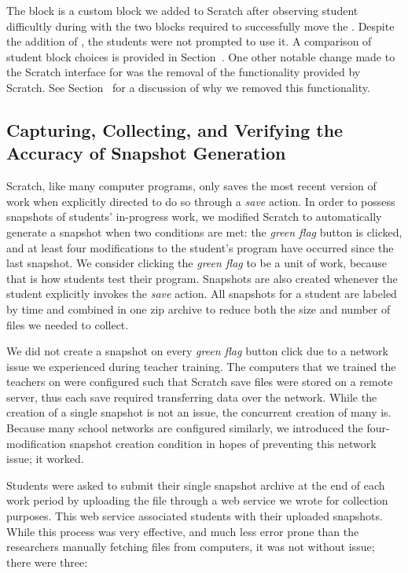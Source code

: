 The \glideto{} block is a custom block we added to Scratch after observing
student difficultly during \sone{} with the two blocks required to successfully
move the \net{}. Despite the addition of \glideto{}, the students were not
prompted to use it. A comparison of student block choices is provided in
Section~. One other notable change made to the Scratch
interface for \stwo{} was the removal of the \dce{} functionality provided by
Scratch. See Section~ for a discussion of why we removed this
functionality.

\subsection{Capturing, Collecting, and Verifying the Accuracy of Snapshot Generation}
Scratch, like many computer programs, only saves the most recent version of
work when explicitly directed to do so through a \emph{save} action. In order
to possess snapshots of students' in-progress work, we modified Scratch to
automatically generate a snapshot when two conditions are met: the \emph{green
  flag} button is clicked, and at least four modifications to the student's
program have occurred since the last snapshot. We consider clicking the
\emph{green flag} to be a unit of work, because that is how students test their
program. Snapshots are also created whenever the student explicitly invokes the
\emph{save} action. All snapshots for a student are labeled by time and
combined in one zip archive to reduce both the size and number of files we
needed to collect.

We did not create a snapshot on every \emph{green flag} button click due to a
network issue we experienced during teacher training. The computers that we
trained the teachers on were configured such that Scratch save files were
stored on a remote server, thus each save required transferring data over the
network. While the creation of a single snapshot is not an issue, the
concurrent creation of many is. Because many school networks are configured
similarly, we introduced the four-modification snapshot creation condition in
hopes of preventing this network issue; it worked.

Students were asked to submit their single snapshot archive at the end of each
work period by uploading the file through a web service we wrote for collection
purposes. This web service associated students with their uploaded
snapshots. While this process was very effective, and much less error prone
than the researchers manually fetching files from computers, it was not without
issue; there were three:

